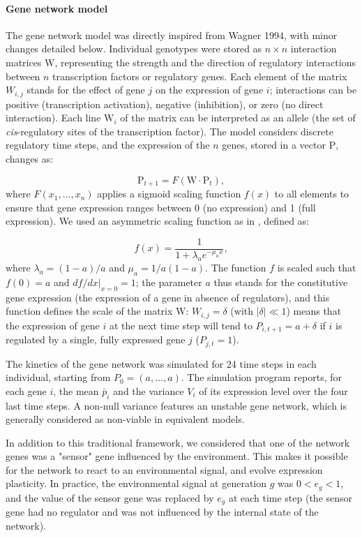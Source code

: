 \documentclass{article}
\begin{document}
\paragraph{Gene network model}

The gene network model was directly inspired from Wagner 1994, with minor changes detailed below. Individual genotypes were stored as $n \times n$ interaction matrices $\bm{\mathrm W}$, representing the strength and the direction of regulatory interactions between $n$ transcription factors or regulatory genes. Each element of the matrix $W_{i,j}$ stands for the effect of gene $j$ on the expression of gene $i$; interactions can be positive (transcription activation), negative (inhibition), or zero (no direct interaction). Each line $\bm{\mathrm W}_i$ of the matrix can be interpreted as an allele (the set of \emph{cis}-regulatory sites of the transcription factor). The model considers discrete regulatory time steps, and the expression of the $n$ genes, stored in a vector $\bm{\mathrm P}$, changes as:

$$\bm{\mathrm P}_{t+1} = F(\bm{\mathrm W} \cdot \bm{\mathrm P}_t),
$$ 
\noindent where $F(x_1, \dots, x_n)$ applies a sigmoid scaling function $f(x)$ to all elements to ensure that gene expression ranges between 0 (no expression) and 1 (full expression). We used an asymmetric scaling function as in \cite{RL16, ORL18}, defined as:

$$
f(x) = \frac{1}{1+ \lambda_a e ^{- \mu_a x}}, 
$$
\noindent where $\lambda_a = (1-a)/a$ and $\mu_a = 1/a(1-a)$. The function $f$ is scaled such that $f(0) = a$ and $df/dx|_{x=0}=1$; the parameter $a$ thus stands for the constitutive gene expression (the expression of a gene in absence of regulators), and this function defines the scale of the matrix $\bm{\mathrm W}$: $W_{i,j} = \delta$ (with $|\delta| \ll 1$) means that the expression of gene $i$ at the next time step will tend to $P_{i,t+1} = a + \delta$ if $i$ is regulated by a single, fully expressed gene $j$ ($P_{j,t} = 1$). 

The kinetics of the gene network was simulated for 24 time steps in each individual, starting from $P_0 = (a, \dots, a)$. The simulation program reports, for each gene $i$, the mean $\bar p_i$ and the variance $V_i$ of its expression level over the four last time steps. A non-null variance features an unstable gene network, which is generally considered as non-viable in equivalent models. 

In addition to this traditional framework, we considered that one of the network genes was a "sensor" gene influenced by the environment. This makes it possible for the network to react to an environmental signal, and evolve expression plasticity. In practice, the environmental signal at generation $g$ was $0 < e_g < 1$, and the value of the sensor gene was replaced by $e_g$ at each time step (the sensor gene had no regulator and was not influenced by the internal state of the network).  
\end{document}
